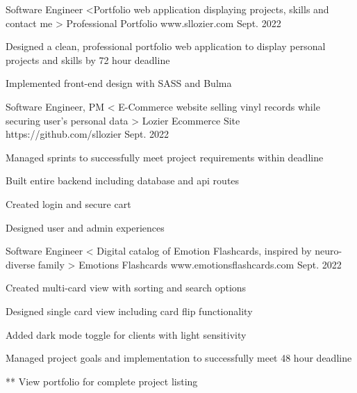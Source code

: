 

\begin{cventries}

  \cventry
    {Software Engineer <Portfolio web application displaying projects, skills and contact me >} %
    {Professional Portfolio} %
    {www.sllozier.com} %
    {Sept. 2022} %
      {
      \begin{cvitems} %
        \item {Designed a clean, professional portfolio web application to display personal projects and skills by 72 hour deadline}
        \item {Implemented front-end design with SASS and Bulma}
      \end{cvitems}
    }

  \cventry
    {Software Engineer, PM < E-Commerce website selling vinyl records while securing user’s personal data >} %
    {Lozier Ecommerce Site} %
    {https://github.com/sllozier} %
    {Sept. 2022} %
      {
      \begin{cvitems} %
        \item {Managed sprints to successfully meet project requirements within deadline}
        \item {Built entire backend including database and api routes}
        \item {Created login and secure cart}
        \item {Designed user and admin experiences}
      \end{cvitems}
    }

\cventry
    {Software Engineer < Digital catalog of Emotion Flashcards, inspired by neuro-diverse family >} %
    {Emotions Flashcards} %
    {www.emotionsflashcards.com} %
    {Sept. 2022} %
      {
      \begin{cvitems} %
        \item {Created multi-card view with sorting and search options}
        \item {Designed single card view including card flip functionality}
        \item {Added dark mode toggle for clients with light sensitivity}
        \item {Managed project goals and implementation to successfully meet 48 hour deadline}
      \end{cvitems}
    }
    
  \cvparagraph
    {** View portfolio for complete project listing} %
    
\end{cventries}
